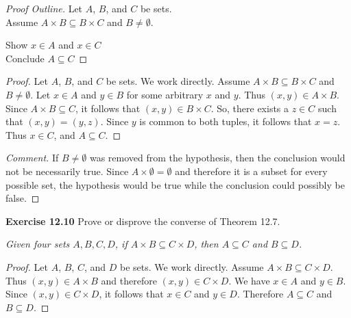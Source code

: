 \documentclass[12pt,oneside]{article}
\newenvironment{exercise}[1]{\vspace{.1in}\noindent\textbf{Exercise #1 \hspace{.05em}}}{}
\begin{document}
\begin{proof}[Proof Outline]
Let $A$, $B$, and $C$ be sets. \\
Assume $A \times B \subseteq B \times C$ and $B \not= \emptyset$.

Show $x \in A$ and $x \in C$ \\
Conclude $A \subseteq C$
\end{proof}

\begin{proof}
Let $A$, $B$, and $C$ be sets. We work directly. Assume $A \times B \subseteq B \times C$ and $B \not= \emptyset$. Let $x \in A$ and $y \in B$ for some arbitrary $x$ and $y$. Thus $(x,y) \in A \times B$. Since $A \times B \subseteq C$, it follows that $(x,y) \in B \times C$. So, there exists a $z \in C$ such that $(x,y) = (y,z)$. Since $y$ is common to both tuples, it follows that $x = z$. Thus $x \in C$, and $A \subseteq C$.
\end{proof}

\begin{proof}[Comment]
If $B \not= \emptyset$ was removed from the hypothesis, then the conclusion would not be necessarily true. Since $A \times \emptyset = \emptyset$ and therefore it is a subset for every possible set, the hypothesis would be true while the conclusion could possibly be false.
\end{proof}



\begin{exercise}{12.10}
Prove or disprove the converse of Theorem 12.7.

\textit{Given four sets $A,B,C,D$, if $A \times B \subseteq C \times D$, then $A \subseteq C$ and $B \subseteq D$.}
\end{exercise}

\begin{proof}
Let $A$, $B$, $C$, and $D$ be sets. We work directly. Assume $A \times B \subseteq C \times D$. Thus $(x, y) \in A \times B$ and therefore $(x,y) \in C \times D$. We have $x \in A$ and $y \in B$. Since $(x,y) \in C \times D$, it follows that $x \in C$ and $y \in D$. Therefore $A \subseteq C$ and $B \subseteq D$.
\end{proof}


\end{document}
